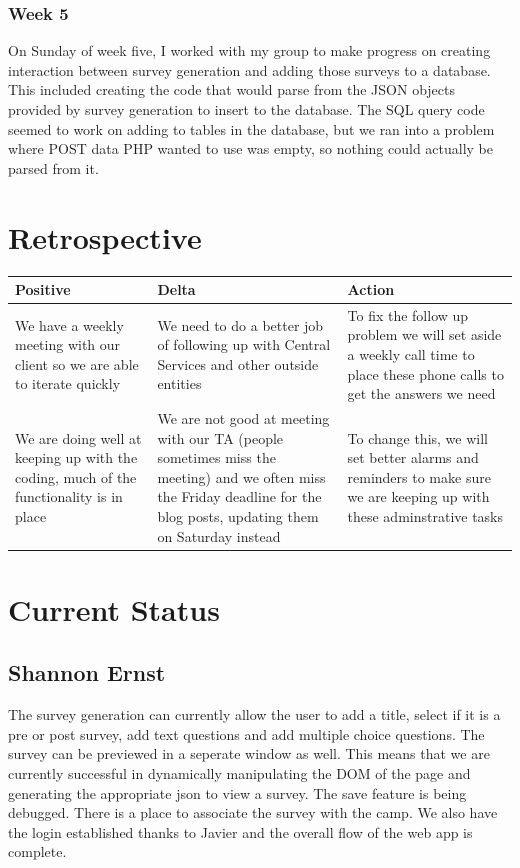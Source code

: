 \documentclass[letterpaper,10pt,serif, draftclsnofoot,onecolumn, compsoc, titlepage]{IEEEtran}
\begin{document}
\subsubsection{Week 5}
On Sunday of week five, I worked with my group to make progress on creating interaction between survey generation and adding those surveys to a database.
This included creating the code that would parse from the JSON objects provided by survey generation to insert to the database.
The SQL query code seemed to work on adding to tables in the database, but we ran into a problem where POST data PHP wanted to use was empty, so nothing could actually be parsed from it.

\section{Retrospective}
\begin{center}
    \begin{tabular}{ | p{5cm} | p{5cm} | p{5cm} |}
    \hline
     Positive & Delta & Action \\ \hline
	We have a weekly meeting with our client so we are able to iterate quickly & We need to do a better job of following up with Central Services and other outside entities & To fix the follow up problem we will set aside a weekly call time to place these phone calls to get the answers we need \\ \hline
  	We are doing well at keeping up with the coding, much of the functionality is in place & We are not good at meeting with our TA (people sometimes miss the meeting) and we often miss the Friday deadline for the blog posts, updating them on Saturday instead & To change this, we will set better alarms and reminders to make sure we are keeping up with these adminstrative tasks \\ \hline
    \end{tabular}
\end{center}

\section{Current Status}

\subsection{Shannon Ernst}
The survey generation can currently allow the user to add a title, select if it is a pre or post survey, add text questions and add multiple choice questions. The survey can be previewed in a seperate window as well. This means that we are currently successful in dynamically manipulating the DOM of the page and generating the appropriate json to view a survey. The save feature is being debugged. There is a place to associate the survey with the camp. We also have the login established thanks to Javier and the overall flow of the web app is complete.  
\end{document}
